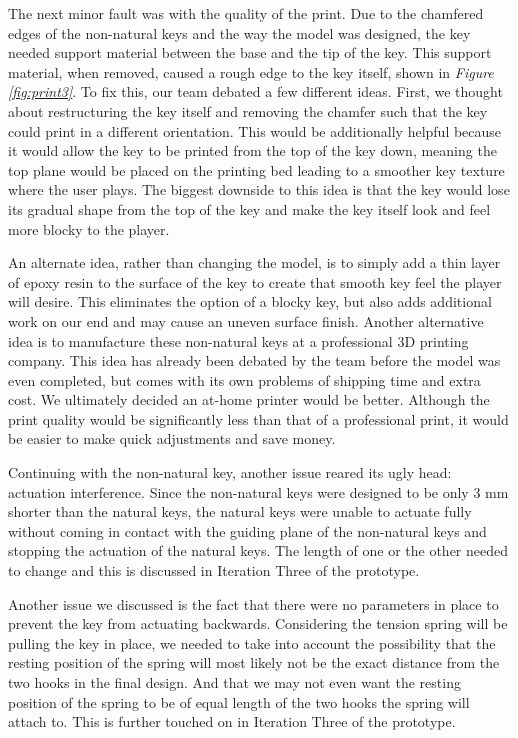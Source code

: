 The next minor fault was with the quality of the print. Due to the chamfered edges of the non-natural keys and the way the model was designed, the key needed support material between the base and the tip of the key. This support material, when removed, caused a rough edge to the key itself, shown in \textit{Figure \ref{fig:print3}}.  To fix this, our team debated a few different ideas. First, we thought about restructuring the key itself and removing the chamfer such that the key could print in a different orientation. This would be additionally helpful because it would allow the key to be printed from the top of the key down, meaning the top plane would be placed on the printing bed leading to a smoother key texture where the user plays. The biggest downside to this idea is that the key would lose its gradual shape from the top of the key and make the key itself look and feel more blocky to the player.

An alternate idea, rather than changing the model, is to simply add a thin layer of epoxy resin to the surface of the key to create that smooth key feel the player will desire. This eliminates the option of a blocky key, but also adds additional work on our end and may cause an uneven surface finish. Another alternative idea is to manufacture these non-natural keys at a professional 3D printing company. This idea has already been debated by the team before the model was even completed, but comes with its own problems of shipping time and extra cost. We ultimately decided an at-home printer would be better. Although the print quality would be significantly less than that of a professional print, it would be easier to make quick adjustments and save money.

Continuing with the non-natural key, another issue reared its ugly head: actuation interference. Since the non-natural keys were designed to be only 3 mm shorter than the natural keys, the natural keys were unable to actuate fully without coming in contact with the guiding plane of the non-natural keys and stopping the actuation of the natural keys. The length of one or the other needed to change and this is discussed in Iteration Three of the prototype.

Another issue we discussed is the fact that there were no parameters in place to prevent the key from actuating backwards. Considering the tension spring will be pulling the key in place, we needed to take into account the possibility that the resting position of the spring will most likely not be the exact distance from the two hooks in the final design. And that we may not even want the resting position of the spring to be of equal length of the two hooks the spring will attach to. This is further touched on in Iteration Three of the prototype.

